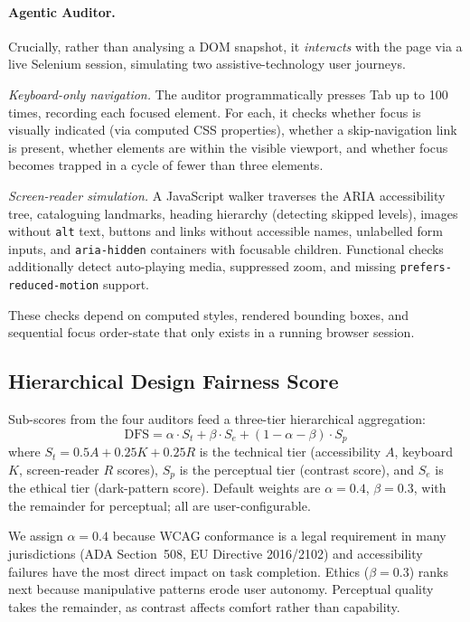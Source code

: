 \documentclass[runningheads]{llncs}
\begin{document}
\paragraph{Agentic Auditor.}
Crucially, rather than analysing a DOM snapshot, it \emph{interacts} with the page via a live Selenium session, simulating two assistive-technology user journeys.

\emph{Keyboard-only navigation.} The auditor programmatically presses Tab up to 100 times, recording each focused element. For each, it checks whether focus is visually indicated (via computed CSS properties), whether a skip-navigation link is present, whether elements are within the visible viewport, and whether focus becomes trapped in a cycle of fewer than three elements.

\emph{Screen-reader simulation.} A JavaScript walker traverses the ARIA accessibility tree, cataloguing landmarks, heading hierarchy (detecting skipped levels), images without \texttt{alt} text, buttons and links without accessible names, unlabelled form inputs, and \texttt{aria-hidden} containers with focusable children. Functional checks additionally detect auto-playing media, suppressed zoom, and missing \texttt{prefers-reduced-motion} support.

These checks depend on computed styles, rendered bounding boxes, and sequential focus order-state that only exists in a running browser session.


\subsection{Hierarchical Design Fairness Score}

Sub-scores from the four auditors feed a three-tier hierarchical aggregation:
\begin{equation}
\text{DFS} = \alpha \cdot S_t + \beta \cdot S_e + (1 - \alpha - \beta) \cdot S_p
\label{eq:dfs}
\end{equation}
where $S_t = 0.5 A + 0.25 K + 0.25 R$ is the technical tier (accessibility $A$, keyboard $K$, screen-reader $R$ scores), $S_p$ is the perceptual tier (contrast score), and $S_e$ is the ethical tier (dark-pattern score). Default weights are $\alpha = 0.4$, $\beta = 0.3$, with the remainder for perceptual; all are user-configurable.

We assign $\alpha = 0.4$ because WCAG conformance is a legal requirement in many jurisdictions (ADA Section~508, EU Directive 2016/2102) and accessibility failures have the most direct impact on task completion. Ethics ($\beta = 0.3$) ranks next because manipulative patterns erode user autonomy. Perceptual quality takes the remainder, as contrast affects comfort rather than capability.
\end{document}
